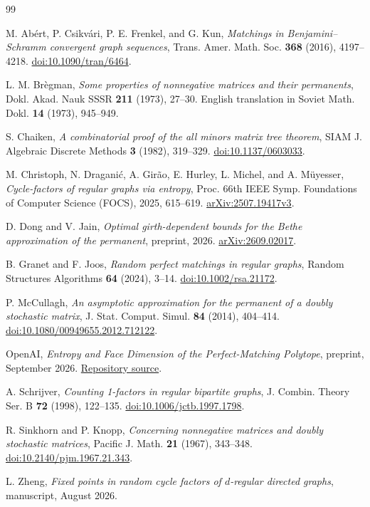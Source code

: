\documentclass[11pt]{article}
\begin{document}
\begin{thebibliography}{99}

M. Ab\'ert, P. Csikv\'ari, P. E. Frenkel, and G. Kun,
\emph{Matchings in Benjamini--Schramm convergent graph sequences},
Trans. Amer. Math. Soc. \textbf{368} (2016), 4197--4218.
\href{https://doi.org/10.1090/tran/6464}{doi:10.1090/tran/6464}.

L. M. Br\`egman,
\emph{Some properties of nonnegative matrices and their permanents},
Dokl. Akad. Nauk SSSR \textbf{211} (1973), 27--30.
English translation in Soviet Math. Dokl. \textbf{14} (1973), 945--949.

S. Chaiken,
\emph{A combinatorial proof of the all minors matrix tree theorem},
SIAM J. Algebraic Discrete Methods \textbf{3} (1982), 319--329.
\href{https://doi.org/10.1137/0603033}{doi:10.1137/0603033}.

M. Christoph, N. Dragani\'c, A. Gir\~ao, E. Hurley, L. Michel, and A. M\"uyesser,
\emph{Cycle-factors of regular graphs via entropy},
Proc. 66th IEEE Symp. Foundations of Computer Science (FOCS), 2025, 615--619.
\href{https://arxiv.org/abs/2507.19417v3}{arXiv:2507.19417v3}.

D. Dong and V. Jain,
\emph{Optimal girth-dependent bounds for the Bethe approximation of the permanent},
preprint, 2026.
\href{https://arxiv.org/abs/2609.02017}{arXiv:2609.02017}.

B. Granet and F. Joos,
\emph{Random perfect matchings in regular graphs},
Random Structures Algorithms \textbf{64} (2024), 3--14.
\href{https://doi.org/10.1002/rsa.21172}{doi:10.1002/rsa.21172}.

P. McCullagh,
\emph{An asymptotic approximation for the permanent of a doubly stochastic matrix},
J. Stat. Comput. Simul. \textbf{84} (2014), 404--414.
\href{https://doi.org/10.1080/00949655.2012.712122}{doi:10.1080/00949655.2012.712122}.

OpenAI,
\emph{Entropy and Face Dimension of the Perfect-Matching Polytope},
preprint, September 2026.
\href{https://github.com/openai/math/tree/main/preprints/Entropy-and-Face-Dimension-of-the-Perfect-Matching-Polytope-September-23-2026}{Repository source}.

A. Schrijver,
\emph{Counting 1-factors in regular bipartite graphs},
J. Combin. Theory Ser. B \textbf{72} (1998), 122--135.
\href{https://doi.org/10.1006/jctb.1997.1798}{doi:10.1006/jctb.1997.1798}.

R. Sinkhorn and P. Knopp,
\emph{Concerning nonnegative matrices and doubly stochastic matrices},
Pacific J. Math. \textbf{21} (1967), 343--348.
\href{https://doi.org/10.2140/pjm.1967.21.343}{doi:10.2140/pjm.1967.21.343}.

L. Zheng,
\emph{Fixed points in random cycle factors of \(d\)-regular directed graphs},
manuscript, August 2026.

\end{thebibliography}
\end{document}
